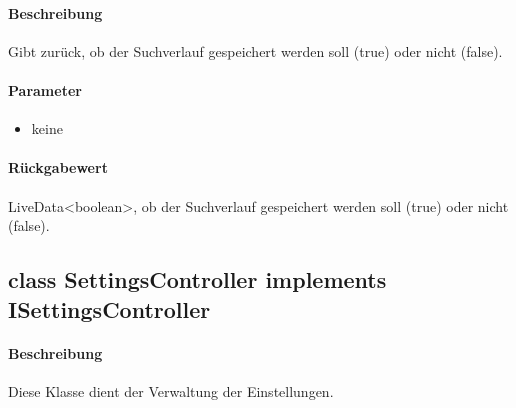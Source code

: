 \paragraph*{Beschreibung}
Gibt zurück, ob der Suchverlauf gespeichert werden soll (true) oder nicht (false).
\paragraph*{Parameter}
\begin{itemize}
    \item keine
\end{itemize}
\paragraph*{Rückgabewert}
LiveData<boolean>, ob der Suchverlauf gespeichert werden soll (true) oder nicht (false).


\subsection{class SettingsController implements ISettingsController}
\paragraph*{Beschreibung}
Diese Klasse dient der Verwaltung der Einstellungen.
